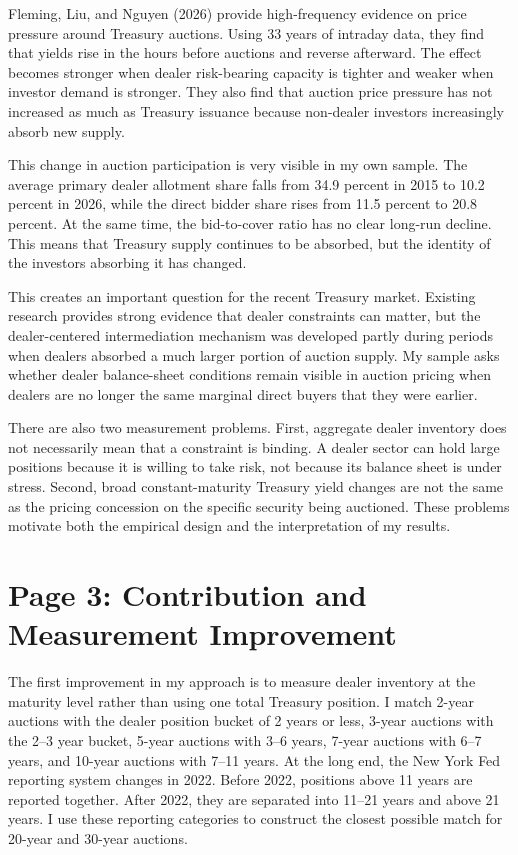 \documentclass[12pt]{article}
\begin{document}
Fleming, Liu, and Nguyen (2026) provide high-frequency evidence on price pressure around Treasury auctions. Using 33 years of intraday data, they find that yields rise in the hours before auctions and reverse afterward. The effect becomes stronger when dealer risk-bearing capacity is tighter and weaker when investor demand is stronger. They also find that auction price pressure has not increased as much as Treasury issuance because non-dealer investors increasingly absorb new supply.

This change in auction participation is very visible in my own sample. The average primary dealer allotment share falls from 34.9 percent in 2015 to 10.2 percent in 2026, while the direct bidder share rises from 11.5 percent to 20.8 percent. At the same time, the bid-to-cover ratio has no clear long-run decline. This means that Treasury supply continues to be absorbed, but the identity of the investors absorbing it has changed.

This creates an important question for the recent Treasury market. Existing research provides strong evidence that dealer constraints can matter, but the dealer-centered intermediation mechanism was developed partly during periods when dealers absorbed a much larger portion of auction supply. My sample asks whether dealer balance-sheet conditions remain visible in auction pricing when dealers are no longer the same marginal direct buyers that they were earlier.

There are also two measurement problems. First, aggregate dealer inventory does not necessarily mean that a constraint is binding. A dealer sector can hold large positions because it is willing to take risk, not because its balance sheet is under stress. Second, broad constant-maturity Treasury yield changes are not the same as the pricing concession on the specific security being auctioned. These problems motivate both the empirical design and the interpretation of my results.

\newpage
\section{Page 3: Contribution and Measurement Improvement}

The first improvement in my approach is to measure dealer inventory at the maturity level rather than using one total Treasury position. I match 2-year auctions with the dealer position bucket of 2 years or less, 3-year auctions with the 2--3 year bucket, 5-year auctions with 3--6 years, 7-year auctions with 6--7 years, and 10-year auctions with 7--11 years. At the long end, the New York Fed reporting system changes in 2022. Before 2022, positions above 11 years are reported together. After 2022, they are separated into 11--21 years and above 21 years. I use these reporting categories to construct the closest possible match for 20-year and 30-year auctions.
\end{document}
